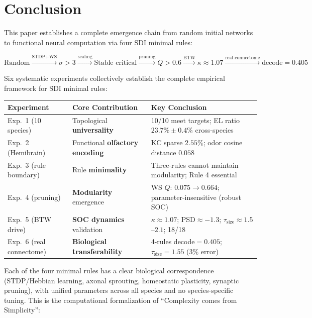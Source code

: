 \documentclass[12pt,a4paper]{article}
\begin{document}
\section{Conclusion}

This paper establishes a complete emergence chain from random initial networks to functional neural computation via four SDI minimal rules:

\begin{equation}
\text{Random} \xrightarrow{\text{STDP+WS}} \sigma>3 \xrightarrow{\text{scaling}} \text{Stable critical} \xrightarrow{\text{pruning}} Q>0.6 \xrightarrow{\text{BTW}} \kappa\approx1.07 \xrightarrow{\text{real connectome}} \text{decode}=0.405
\end{equation}

Six systematic experiments collectively establish the complete empirical framework for SDI minimal rules:

\begin{center}
\begin{tabular}{p{2.5cm}p{4cm}p{6cm}}
\toprule
\textbf{Experiment} & \textbf{Core Contribution} & \textbf{Key Conclusion} \\
\midrule
Exp.\ 1 (10 species) & Topological \textbf{universality} & 10/10 meet targets; EL ratio $23.7\%\pm0.4\%$ cross-species \\
Exp.\ 2 (Hemibrain) & Functional \textbf{olfactory encoding} & KC sparse $2.55\%$; odor cosine distance $0.058$ \\
Exp.\ 3 (rule boundary) & Rule \textbf{minimality} & Three-rules cannot maintain modularity; Rule 4 essential \\
Exp.\ 4 (pruning) & \textbf{Modularity} emergence & WS $Q$: $0.075\to0.664$; parameter-insensitive (robust SOC) \\
Exp.\ 5 (BTW drive) & \textbf{SOC dynamics} validation & $\kappa\approx1.07$; PSD$\approx-1.3$; $\tau_{\text{size}}\approx1.5$--$2.1$; 18/18 \\
Exp.\ 6 (real connectome) & \textbf{Biological transferability} & 4-rules decode$=0.405$; $\tau_{\text{size}}=1.55$ (3\% error) \\
\bottomrule
\end{tabular}
\end{center}

Each of the four minimal rules has a clear biological correspondence (STDP/Hebbian learning, axonal sprouting, homeostatic plasticity, synaptic pruning), with unified parameters across all species and no species-specific tuning. This is the computational formalization of ``Complexity comes from Simplicity'':
\end{document}
